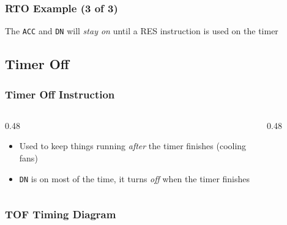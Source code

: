 \begin{frame}
    \frametitle{RTO Example (3 of 3)}

    \begin{figure}
        \centering
        
    \end{figure}

    \vspace{0.5em}
    \centering
    {\footnotesize The \texttt{ACC} and \texttt{DN} will \emph{stay on} until a RES instruction is used on the timer\par}
\end{frame}

\subsection{Timer Off}

\begin{frame}
    \frametitle{Timer Off Instruction}

    \begin{columns}
        \begin{column}{0.48\linewidth}
            \begin{itemize}
                \item Used to keep things running \emph{after} the timer finishes (cooling fans)
                \item \texttt{DN} is on most of the time, it turns \emph{off} when the timer finishes
            \end{itemize}
        \end{column}
        \begin{column}{0.48\linewidth}
            \begin{figure}
                \centering
                
            \end{figure}
        \end{column}
    \end{columns}
\end{frame}

\begin{frame}
    \frametitle{TOF Timing Diagram}

    \centering
    \resizebox{0.875\linewidth}{!}{
        
    }
\end{frame}


